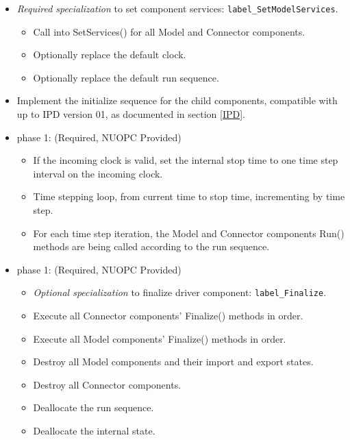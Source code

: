 \begin{itemize}
\begin{itemize}
  \item {\it Required specialization} to set component services: {\tt label\_SetModelServices}. 
  \begin{itemize}
    \item Call into SetServices() for all Model and Connector components.
    \item Optionally replace the default clock. 
    \item Optionally replace the default run sequence.
  \end{itemize}
  \item Implement the initialize sequence for the child components, compatible with up to IPD version 01, as documented in section \ref{IPD}.
  \end{itemize}  
\end{itemize}

\begin{itemize}
\item phase 1: ({\sc Required, NUOPC Provided})
  \begin{itemize}
  \item If the incoming clock is valid, set the internal stop time to one time step interval on the incoming clock.
  \item Time stepping loop, from current time to stop time, incrementing by time step.
  \item For each time step iteration, the Model and Connector components Run() methods are being called according to the run sequence.
  \end{itemize}    
\end{itemize}

\begin{itemize}
\item phase 1: ({\sc Required, NUOPC Provided})
  \begin{itemize}
  \item {\it Optional specialization} to finalize driver component: {\tt label\_Finalize}.
  \item Execute all Connector components' Finalize() methods in order.
  \item Execute all Model components' Finalize() methods in order.
  \item Destroy all Model components and their import and export states.
  \item Destroy all Connector components.
  \item Deallocate the run sequence.
  \item Deallocate the internal state.
  \end{itemize}      
\end{itemize}

